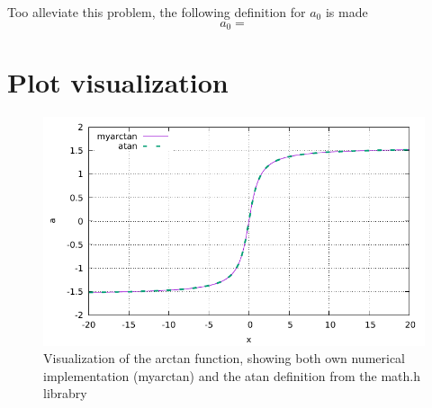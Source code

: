 \documentclass{article}
\begin{document}
Too alleviate this problem, the following definition for $a_0$ is made
\begin{equation}
	a_0 = 
\end{equation}

\section{Plot visualization}


\begin{figure}
	\centering
	\includegraphics{plot.pdf}
	\caption{Visualization of the arctan function, showing both own numerical implementation (myarctan) and the atan definition from the math.h librabry}
	\label{fig:plot}
\end{figure}
\end{document}
